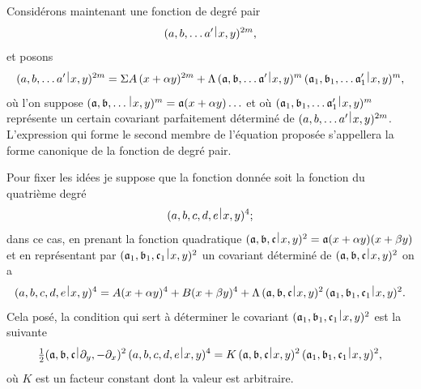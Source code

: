 \documentclass[11pt,a4paper]{book}
\theoremstyle{plain}
\newcommand{\wrule}{\hspace{-0.1em}\mid\hspace{-0.1em}}
\begin{document}
\noindent
Consid\'{e}rons maintenant une fonction de degr\'{e} pair
\[
(a,b,\ldots a'\,\raisebox{0.5ex}{$\wrule$}\,x,y)^{2m},
\]
et posons
\[
(a,b,\ldots a'\,\raisebox{0.5ex}{$\wrule$}\,x,y)^{2m}=\Sigma A\,(x+\alpha y)^{2m}+\Lambda\,(\mathfrak{a},\mathfrak{b},\ldots\mathfrak{a}'\,\raisebox{0.5ex}{$\wrule$}\,x,y)^m\,(\mathfrak{a}_1,\mathfrak{b}_1,\ldots\mathfrak{a}_1'\,\raisebox{0.5ex}{$\wrule$}\,x,y)^m,
\]
o\`{u} l'on suppose $(\mathfrak{a},\mathfrak{b},\ldots\,\raisebox{0.5ex}{$\wrule$}\,x,y)^m=\mathfrak{a}(x+\alpha y)\ldots$ et o\`{u} $(\mathfrak{a}_1,\mathfrak{b}_1,\ldots\mathfrak{a}_1'\,\raisebox{0.5ex}{$\wrule$}\,x,y)^m$ repr\'{e}sente un certain covariant parfaitement d\'{e}termin\'{e} de $(a,b,\ldots a'\,\raisebox{0.5ex}{$\wrule$}\,x,y)^{2m}$. L'expression qui forme le second membre de l'\'{e}quation propos\'{e}e s'appellera la forme canonique de la fonction de degr\'{e} pair.

Pour fixer les id\'{e}es je suppose que la fonction donn\'{e}e soit la fonction du quatri\`{e}me degr\'{e}
\[
(a,b,c,d,e\,\raisebox{0.5ex}{$\wrule$}\,x,y)^4;
\]
dans ce cas, en prenant la fonction quadratique $(\mathfrak{a},\mathfrak{b},\mathfrak{c}\,\raisebox{0.5ex}{$\wrule$}\,x,y)^2=\mathfrak{a}(x+\alpha y)(x+\beta y)$ et en repr\'{e}sentant par $(\mathfrak{a}_1,\mathfrak{b}_1,\mathfrak{c}_1\,\raisebox{0.5ex}{$\wrule$}\,x,y)^2$ un covariant d\'{e}termin\'{e} de $(\mathfrak{a},\mathfrak{b},\mathfrak{c}\,\raisebox{0.5ex}{$\wrule$}\,x,y)^2$ on a
\[
(a,b,c,d,e\,\raisebox{0.5ex}{$\wrule$}\,x,y)^4=A(x+\alpha y)^4+B(x+\beta y)^4+\Lambda\,(\mathfrak{a},\mathfrak{b},\mathfrak{c}\,\raisebox{0.5ex}{$\wrule$}\,x,y)^2\,(\mathfrak{a}_1,\mathfrak{b}_1,\mathfrak{c}_1\,\raisebox{0.5ex}{$\wrule$}\,x,y)^2.
\]
Cela pos\'{e}, la condition qui sert \`{a} d\'{e}terminer le covariant $(\mathfrak{a}_1,\mathfrak{b}_1,\mathfrak{c}_1\,\raisebox{0.5ex}{$\wrule$}\,x,y)^2$ est la suivante
\[
\tfrac{1}{2}(\mathfrak{a},\mathfrak{b},\mathfrak{c}\,\raisebox{0.5ex}{$\wrule$}\,\partial_y,-\partial_x)^2\,(a,b,c,d,e\,\raisebox{0.5ex}{$\wrule$}\,x,y)^4=K\,(\mathfrak{a},\mathfrak{b},\mathfrak{c}\,\raisebox{0.5ex}{$\wrule$}\,x,y)^2\,(\mathfrak{a}_1,\mathfrak{b}_1,\mathfrak{c}_1\,\raisebox{0.5ex}{$\wrule$}\,x,y)^2,
\]
o\`{u} $K$ est un facteur constant dont la valeur est arbitraire.
\end{document}
